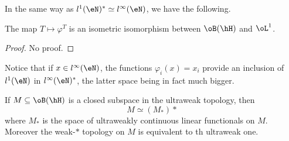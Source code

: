 In the same way as $l^1(\eN)^*\simeq l^{\infty}(\eN)$, we have the following.
\begin{theorem}
The map $T\mapsto \varphi^T$ is an isometric isomorphism between $\oB(\hH)$ and $\oL^1$.
\end{theorem}

\begin{proof}
No proof.
\end{proof}
Notice that if $x\in l^{\infty}(\eN)$, the functions $\varphi_i(x)=x_i$ provide an inclusion of $l^1(\eN)$ in $l^{\infty}(\eN)^*$, the latter space being in fact much bigger.

\begin{theorem}
If $M\subseteq\oB(\hH)$ is a closed subspace in the ultraweak topology, then
\begin{equation}
	M\simeq (M_{*})*
\end{equation}
where $M_*$ is the space of ultraweakly continuous linear functionals on $M$. Moreover the weak-$*$ topology on $M$ is equivalent to th ultraweak one.
\end{theorem}
